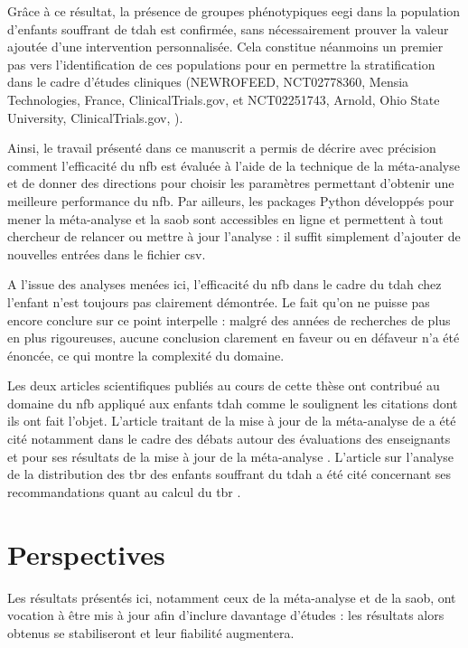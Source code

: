 Grâce à ce résultat, la présence de 
groupes phénotypiques \gls{eegi} dans la population d'enfants souffrant de \gls{tdah} est confirmée, sans nécessairement prouver la valeur ajoutée d'une 
intervention personnalisée. Cela constitue néanmoins un premier pas vers l'identification de ces populations pour en 
permettre la stratification dans le cadre d'études cliniques (NEWROFEED, NCT02778360, Mensia Technologies, France, ClinicalTrials.gov, \citet{Bioulac2019} et NCT02251743, Arnold, Ohio State University, 
ClinicalTrials.gov, \citet{Kerson2013}).

Ainsi, le travail présenté dans ce manuscrit a permis de décrire avec précision comment l'efficacité du \gls{nfb} est évaluée à l'aide de 
la technique de la méta-analyse et de donner des 
directions pour choisir les paramètres permettant d'obtenir une meilleure performance du \gls{nfb}. Par ailleurs, les packages Python développés pour mener 
la méta-analyse et la \gls{saob}
sont accessibles en ligne et permettent à tout chercheur de relancer ou mettre à jour l'analyse : il suffit simplement d'ajouter de nouvelles 
entrées dans le fichier \gls{csv}.

A l'issue des analyses menées ici, l'efficacité du \gls{nfb} dans le cadre du \gls{tdah} chez l'enfant n'est toujours pas clairement démontrée. 
Le fait qu'on ne puisse pas encore conclure sur ce point interpelle : malgré des années de recherches de plus en plus rigoureuses, aucune conclusion
clarement en faveur ou en défaveur n'a été énoncée, ce qui montre la complexité du domaine.   

Les deux articles scientifiques publiés au cours de cette thèse ont contribué au domaine du \gls{nfb} appliqué aux enfants \gls{tdah}
comme le soulignent les citations dont ils ont fait l'objet. L'article traitant de la mise à jour de la méta-analyse de \citet{Cortese2016} 
\citep{Bussalb2019clinical} a été cité notamment dans le cadre des débats autour des évaluations des enseignants \citep{Bottinger2020} et pour ses résultats
de la mise à jour de la méta-analyse \citep{Bluschke2020}. L'article sur l'analyse de la distribution des \gls{tbr} des enfants souffrant du \gls{tdah} 
\citep{Bussalb2019clinical}
a été cité concernant ses recommandations quant au calcul du \gls{tbr} \citep{Bioulac2020}. 

\section{Perspectives}

Les résultats présentés ici, notamment ceux de la méta-analyse et de la \gls{saob}, ont vocation à être mis à jour afin d'inclure davantage 
d'études : les résultats alors obtenus se stabiliseront et leur fiabilité augmentera.   

